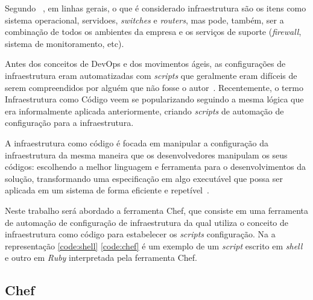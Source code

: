 Segundo ~, em linhas gerais, o que é considerado
infraestrutura são os itens como sistema operacional, servidoes,
\textit{switches} e \textit{routers}, mas pode, também, ser a combinação
de todos os ambientes da empresa e os serviços de suporte (\textit{firewall},
sistema de monitoramento, etc).

Antes dos conceitos de DevOps e dos movimentos ágeis, as configurações de
infraestrutura eram automatizadas com \textit{scripts} que geralmente eram
difíceis de serem compreendidos por alguém que não fosse o autor~\cite{huttermann:2012}.
Recentemente, o termo Infraestrutura como Código veem se popularizando
seguindo a mesma lógica que era informalmente aplicada anteriormente, criando
\textit{scripts} de automação de configuração para a infraestrutura.

A infraestrutura como código é focada em manipular a configuração da infraestrutura
da mesma maneira que os desenvolvedores manipulam os seus códigos: escolhendo a melhor
linguagem e ferramenta para o desenvolvimentos da solução, transformando uma especificação
em algo executável que possa ser aplicada em um sistema de forma eficiente e
repetível~\cite{huttermann:2012}. \\

\noindent\begin{minipage}{.45\textwidth}
  \label{code:shell}
  \lstset{style=shell}
  
\end{minipage}\hfill
\begin{minipage}{.45\textwidth}
  \label{code:chef}
  \lstset{style=shell}
  
\end{minipage}


Neste trabalho será abordado a ferramenta Chef, que consiste em uma ferramenta de
automação de configuração de infraestrutura da qual utiliza o conceito de infraestrutura
como código para estabelecer os \textit{scripts} configuração. Na a representação \ref{code:shell}
\ref{code:chef} é um exemplo de um \textit{script} escrito em \textit{shell} e outro em \textit{Ruby}
interpretada pela ferramenta Chef.

\subsection{Chef}
\label{sec:chef}

